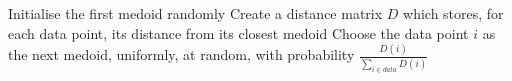 \begin{algorithmic}[1]
    \State Initialise the first medoid randomly
	\Repeat
		\State Create a distance matrix $D$ which stores, for each data point, its distance from its closest medoid
		\State Choose the data point $i$ as the next medoid, uniformly, at random, with probability $\frac{D(i)}{\sum_{i \in data} D(i)}$
\EndProcedure
\end{algorithmic}